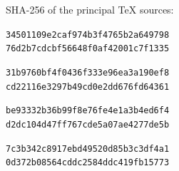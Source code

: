 \documentclass[11pt,a4paper]{article}
\theoremstyle{remark}\newtheorem{remark}[theorem]{Remark}
\begin{document}
\smallskip\noindent SHA-256 of the principal TeX sources:\par
\noindent [226] \texttt{34501109e2caf974b3f4765b2a649798}\\\hspace*{2.7em}\texttt{76d2b7cdcbf56648f0af42001c7f1335}\par
\noindent [227] \texttt{31b9760bf4f0436f333e96ea3a190ef8}\\\hspace*{2.7em}\texttt{cd22116e3297b49cd0e2dd676fd64361}\par
\noindent [243] \texttt{be93332b36b99f8e76fe4e1a3b4ed6f4}\\\hspace*{2.7em}\texttt{d2dc104d47ff767cde5a07ae4277de5b}\par
\noindent [244] \texttt{7c3b342c8917ebd49520d85b3c3df4a1}\\\hspace*{2.7em}\texttt{0d372b08564cddc2584ddc419fb15773}\par
\end{document}
